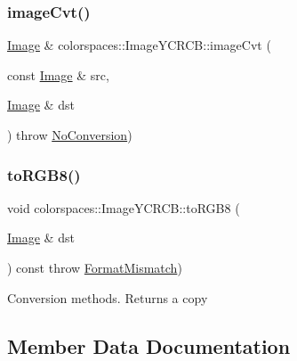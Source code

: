 \subsubsection{\texorpdfstring{image\+Cvt()}{imageCvt()}}
{\footnotesize\ttfamily \hyperlink{classcolorspaces_1_1_image}{Image} \& colorspaces\+::\+Image\+Y\+C\+R\+C\+B\+::image\+Cvt (\begin{DoxyParamCaption}\item[{const \hyperlink{classcolorspaces_1_1_image}{Image} \&}]{src,  }\item[{\hyperlink{classcolorspaces_1_1_image}{Image} \&}]{dst }\end{DoxyParamCaption}) throw  \hyperlink{classcolorspaces_1_1_image_1_1_no_conversion}{No\+Conversion}) \hspace{0.3cm}{\ttfamily [static]}}

\mbox{\label{classcolorspaces_1_1_image_y_c_r_c_b_a9b6dbc86cb1e608f7d4f3f3b31f2f229}} 
\subsubsection{\texorpdfstring{to\+R\+G\+B8()}{toRGB8()}}
{\footnotesize\ttfamily void colorspaces\+::\+Image\+Y\+C\+R\+C\+B\+::to\+R\+G\+B8 (\begin{DoxyParamCaption}\item[{\hyperlink{classcolorspaces_1_1_image}{Image} \&}]{dst }\end{DoxyParamCaption}) const throw  \hyperlink{classcolorspaces_1_1_image_1_1_format_mismatch}{Format\+Mismatch}) }

Conversion methods. Returns a copy 

\subsection{Member Data Documentation}
\mbox{\label{classcolorspaces_1_1_image_y_c_r_c_b_a9423fb6d470113987bd078e88ff46cb8}} 

